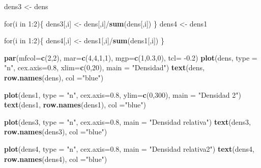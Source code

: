 \documentclass[]{book}
\newenvironment{Shaded}{\begin{snugshade}}{\end{snugshade}}
\newcommand{\KeywordTok}[1]{\textcolor[rgb]{0.13,0.29,0.53}{\textbf{{#1}}}}
\newcommand{\DataTypeTok}[1]{\textcolor[rgb]{0.13,0.29,0.53}{{#1}}}
\newcommand{\DecValTok}[1]{\textcolor[rgb]{0.00,0.00,0.81}{{#1}}}
\newcommand{\FloatTok}[1]{\textcolor[rgb]{0.00,0.00,0.81}{{#1}}}
\newcommand{\StringTok}[1]{\textcolor[rgb]{0.31,0.60,0.02}{{#1}}}
\newcommand{\NormalTok}[1]{{#1}}
\begin{document}
\begin{Shaded}
\begin{Highlighting}[]
\NormalTok{dens3 <-}\StringTok{ }\NormalTok{dens}

\NormalTok{for(i in }\DecValTok{1}\NormalTok{:}\DecValTok{2}\NormalTok{)\{}
\NormalTok{dens3[,i] <-}\StringTok{ }\NormalTok{dens[,i]/}\KeywordTok{sum}\NormalTok{(dens[,i])}
\NormalTok{\}}
\NormalTok{dens4 <-}\StringTok{ }\NormalTok{dens1}

\NormalTok{for(i in }\DecValTok{1}\NormalTok{:}\DecValTok{2}\NormalTok{)\{}
\NormalTok{dens4[,i] <-}\StringTok{ }\NormalTok{dens1[,i]/}\KeywordTok{sum}\NormalTok{(dens1[,i])}
\NormalTok{\}}

\KeywordTok{par}\NormalTok{(}\DataTypeTok{mfcol=}\KeywordTok{c}\NormalTok{(}\DecValTok{2}\NormalTok{,}\DecValTok{2}\NormalTok{), }\DataTypeTok{mar=}\KeywordTok{c}\NormalTok{(}\DecValTok{4}\NormalTok{,}\DecValTok{4}\NormalTok{,}\DecValTok{1}\NormalTok{,}\DecValTok{1}\NormalTok{), }\DataTypeTok{mgp=}\KeywordTok{c}\NormalTok{(}\DecValTok{1}\NormalTok{,}\FloatTok{0.3}\NormalTok{,}\DecValTok{0}\NormalTok{), }\DataTypeTok{tcl=} \NormalTok{-}\FloatTok{0.2}\NormalTok{)}
\KeywordTok{plot}\NormalTok{(dens, }\DataTypeTok{type =} \StringTok{"n"}\NormalTok{, }\DataTypeTok{cex.axis=}\FloatTok{0.8}\NormalTok{, }\DataTypeTok{xlim=}\KeywordTok{c}\NormalTok{(}\DecValTok{0}\NormalTok{,}\DecValTok{20}\NormalTok{), }\DataTypeTok{main =} \StringTok{"Densidad"}\NormalTok{) }
\KeywordTok{text}\NormalTok{(dens, }\KeywordTok{row.names}\NormalTok{(dens), }\DataTypeTok{col =}\StringTok{"blue"}\NormalTok{)}

\KeywordTok{plot}\NormalTok{(dens1, }\DataTypeTok{type =} \StringTok{"n"}\NormalTok{, }\DataTypeTok{cex.axis=}\FloatTok{0.8}\NormalTok{, }\DataTypeTok{ylim=}\KeywordTok{c}\NormalTok{(}\DecValTok{0}\NormalTok{,}\DecValTok{300}\NormalTok{), }\DataTypeTok{main =} \StringTok{"Densidad 2"}\NormalTok{) }
\KeywordTok{text}\NormalTok{(dens1, }\KeywordTok{row.names}\NormalTok{(dens1), }\DataTypeTok{col =}\StringTok{"blue"}\NormalTok{)}

\KeywordTok{plot}\NormalTok{(dens3, }\DataTypeTok{type =} \StringTok{"n"}\NormalTok{, }\DataTypeTok{cex.axis=}\FloatTok{0.8}\NormalTok{, }\DataTypeTok{main =} \StringTok{"Densidad relativa"}\NormalTok{) }
\KeywordTok{text}\NormalTok{(dens3, }\KeywordTok{row.names}\NormalTok{(dens3), }\DataTypeTok{col =}\StringTok{"blue"}\NormalTok{)}

\KeywordTok{plot}\NormalTok{(dens4, }\DataTypeTok{type =} \StringTok{"n"}\NormalTok{, }\DataTypeTok{cex.axis=}\FloatTok{0.8}\NormalTok{, }\DataTypeTok{main =} \StringTok{"Densidad relativa2"}\NormalTok{) }
\KeywordTok{text}\NormalTok{(dens4, }\KeywordTok{row.names}\NormalTok{(dens4), }\DataTypeTok{col =}\StringTok{"blue"}\NormalTok{)}
\end{Highlighting}
\end{Shaded}
\end{document}
